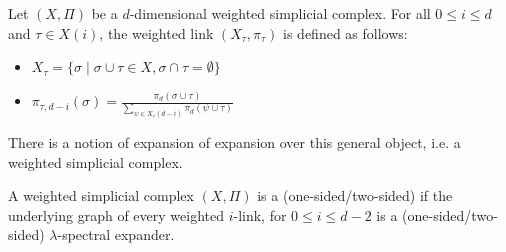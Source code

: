 \begin{definition}
    Let \((X, \Pi)\) be a \(d\)-dimensional weighted simplicial complex. For all \(0 \leq i \leq d\) and \(\tau \in X(i)\), the weighted link \((X_\tau, \pi_\tau)\) is defined as follows:
    \begin{itemize}
        \item \(X_\tau =  \{ \sigma \mid \sigma \cup \tau \in X, \sigma \cap \tau = \emptyset \}  \) 
        \item \(\pi_{\tau, d - i}(\sigma) = \frac{\pi_{d}(\sigma \cup \tau)}{\sum_{\psi\in X_{\tau}(d - i)} \pi_{d}(\psi \cup \tau)}\)
    \end{itemize}
\end{definition}

There is a notion of expansion of expansion over this general object, i.e. a weighted simplicial
complex. 

\begin{definition}
    A weighted simplicial complex \((X, \Pi)\) is a (one-sided/two-sided)  if the underlying graph of every weighted \(i\)-link, for \(0 \leq i \leq d-2\) is a (one-sided/two-sided) \(\lambda\)-spectral expander.
\end{definition}



